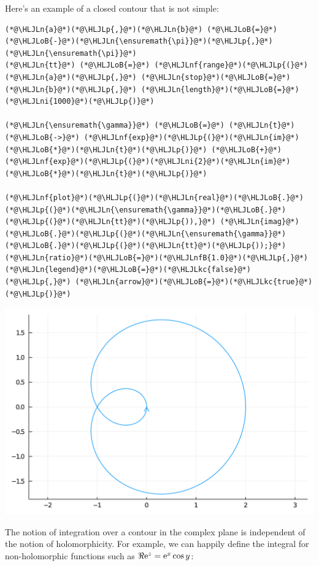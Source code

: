 \documentclass[12pt,a4paper]{article}
\newcommand{\HLJLkc}[1]{\textcolor[RGB]{59,151,46}{\textit{#1}}}
\newcommand{\HLJLn}[1]{#1}
\newcommand{\HLJLnf}[1]{\textcolor[RGB]{66,102,213}{#1}}
\newcommand{\HLJLnfB}[1]{\textcolor[RGB]{59,151,46}{#1}}
\newcommand{\HLJLni}[1]{\textcolor[RGB]{59,151,46}{#1}}
\newcommand{\HLJLoB}[1]{\textcolor[RGB]{102,102,102}{\textbf{#1}}}
\newcommand{\HLJLp}[1]{#1}
\def\E{ {\rm e} }
\begin{document}
Here's an example of a closed contour that is not simple:


\begin{lstlisting}
(*@\HLJLn{a}@*)(*@\HLJLp{,}@*)(*@\HLJLn{b}@*) (*@\HLJLoB{=}@*) (*@\HLJLoB{-}@*)(*@\HLJLn{\ensuremath{\pi}}@*)(*@\HLJLp{,}@*) (*@\HLJLn{\ensuremath{\pi}}@*)
(*@\HLJLn{tt}@*) (*@\HLJLoB{=}@*) (*@\HLJLnf{range}@*)(*@\HLJLp{(}@*)(*@\HLJLn{a}@*)(*@\HLJLp{,}@*) (*@\HLJLn{stop}@*)(*@\HLJLoB{=}@*)(*@\HLJLn{b}@*)(*@\HLJLp{,}@*) (*@\HLJLn{length}@*)(*@\HLJLoB{=}@*)(*@\HLJLni{1000}@*)(*@\HLJLp{)}@*)

(*@\HLJLn{\ensuremath{\gamma}}@*) (*@\HLJLoB{=}@*) (*@\HLJLn{t}@*) (*@\HLJLoB{->}@*) (*@\HLJLnf{exp}@*)(*@\HLJLp{(}@*)(*@\HLJLn{im}@*)(*@\HLJLoB{*}@*)(*@\HLJLn{t}@*)(*@\HLJLp{)}@*) (*@\HLJLoB{+}@*)(*@\HLJLnf{exp}@*)(*@\HLJLp{(}@*)(*@\HLJLni{2}@*)(*@\HLJLn{im}@*)(*@\HLJLoB{*}@*)(*@\HLJLn{t}@*)(*@\HLJLp{)}@*)

(*@\HLJLnf{plot}@*)(*@\HLJLp{(}@*)(*@\HLJLn{real}@*)(*@\HLJLoB{.}@*)(*@\HLJLp{(}@*)(*@\HLJLn{\ensuremath{\gamma}}@*)(*@\HLJLoB{.}@*)(*@\HLJLp{(}@*)(*@\HLJLn{tt}@*)(*@\HLJLp{)),}@*) (*@\HLJLn{imag}@*)(*@\HLJLoB{.}@*)(*@\HLJLp{(}@*)(*@\HLJLn{\ensuremath{\gamma}}@*)(*@\HLJLoB{.}@*)(*@\HLJLp{(}@*)(*@\HLJLn{tt}@*)(*@\HLJLp{));}@*) (*@\HLJLn{ratio}@*)(*@\HLJLoB{=}@*)(*@\HLJLnfB{1.0}@*)(*@\HLJLp{,}@*) (*@\HLJLn{legend}@*)(*@\HLJLoB{=}@*)(*@\HLJLkc{false}@*)(*@\HLJLp{,}@*) (*@\HLJLn{arrow}@*)(*@\HLJLoB{=}@*)(*@\HLJLkc{true}@*)(*@\HLJLp{)}@*)
\end{lstlisting}

\includegraphics[width=\linewidth]{jl_z7eR69/Lecture1_20_1.pdf}

The notion of integration over a contour in the complex plane is independent of the notion of holomorphicity. For example, we can happily define the integral for non-holomorphic functions such as $\Re \E^z = \E^x \cos y$:
\end{document}
